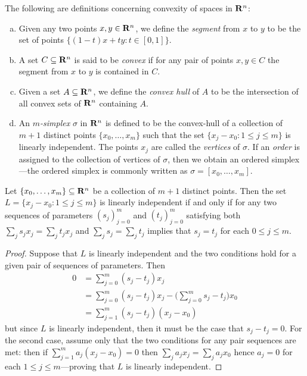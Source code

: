 \begin{definition}[Convexity]
\label{def:convexity}
The following are definitions concerning convexity of spaces in \(\mathbf{R}^n\):
\begin{enumerate}[(a)]\setlength\itemsep{0em}
\item Given any two points \(x, y \in \mathbf{R}^n\), we define the \emph{segment} from
  \(x\) to \(y\) to be the set of points
  \(\{(1-t) x + t y \colon t \in [0, 1]\}\).

\item A set \(C \subseteq \mathbf{R}^n\) is said to be \emph{convex} if for any pair of
  points \(x, y \in C\) the segment from \(x\) to \(y\) is contained in \(C\).

\item Given a set \(A \subseteq \mathbf{R}^n\), we define the \emph{convex hull} of
  \(A\) to be the intersection of all convex sets of \(\mathbf{R}^n\) containing \(A\).

\item An \emph{\(m\)-simplex} \(\sigma\) in \(\mathbf{R}^n\) is defined to be the
  convex-hull of a collection of \(m+1\) distinct points \(\{x_0, \dots, x_m\}\)
  such that the set \(\{x_j - x_0 \colon 1 \leq j \leq m\}\) is linearly
  independent. The points \(x_j\) are called the \emph{vertices} of
  \(\sigma\). If an \emph{order} is assigned to the collection of vertices of
  \(\sigma\), then we obtain an ordered simplex---the ordered simplex is
  commonly written as \(\sigma = [x_0, \dots, x_m]\).
\end{enumerate}
\end{definition}

\begin{lemma}
\label{lem:linear-independence-simplex}
Let \(\{x_0, \dots, x_m\} \subseteq \mathbf{R}^n\) be a collection of \(m+1\) distinct
points. Then the set \(L = \{x_j - x_0 \colon 1 \leq j \leq m\}\) is linearly
independent if and only if for any two sequences of parameters \((s_j)_{j=0}^m\)
and \((t_j)_{j=0}^m\) satisfying both \(\sum_j s_j x_j = \sum_j t_j x_j\) and
\(\sum_j s_j = \sum_j t_j\) implies that \(s_j = t_j\) for each \(0 \leq j \leq m\).
\end{lemma}

\begin{proof}
Suppose that \(L\) is linearly independent and the two conditions hold for a given
pair of sequences of parameters. Then
\begin{align*}
  0 &= \sum_{j=0}^m (s_j - t_j) x_j \\
  &= \sum_{j=0}^m (s_j - t_j) x_j - \Big( \sum_{j=0}^m s_j - t_j \Big) x_0 \\
  &= \sum_{j=1}^{m} (s_j - t_j) (x_j - x_0)
\end{align*}
but since \(L\) is linearly independent, then it must be the case that
\(s_j - t_j = 0\). For the second case, assume only that the two conditions for
any pair sequences are met: then if \(\sum_{j=1}^m a_j (x_j - x_0) = 0\) then
\(\sum_j a_j x_j = \sum_j a_j x_0\) hence \(a_j = 0\) for each
\(1 \leq j \leq m\)---proving that \(L\) is linearly independent.
\end{proof}

